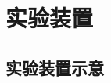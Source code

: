 \documentclass[font=default]{mpltx}
\newcommand{\note}[1]{{\color{gray}#1}}
\newcommand*\cs[1]{\texttt{\textbackslash #1}}
\newcommand*\code[1]{\texttt{#1}}
\newcommand*\file[1]{\textbf{\texttt{#1}}}
\begin{document}





\section{实验装置}
\subsection{实验装置示意}
\end{document}
